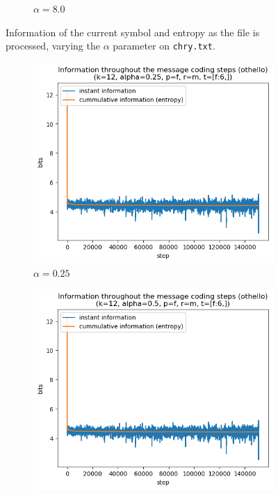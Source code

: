 \documentclass{article}
\begin{document}
\begin{figure}
\begin{subfigure}[b]{0.3\textwidth}
\begin{center}
        \end{center}
        \caption{$\alpha = 8.0$}
        \label{fig:results-alpha-8.0}
    \end{subfigure}
    \caption{Information of the current symbol and entropy as the file is processed, varying the $\alpha$ parameter on \verb|chry.txt|.}
    \label{fig:results-alpha}
\end{figure}

\begin{figure}
    \begin{subfigure}[b]{0.3\textwidth}
        \begin{center}
            \includegraphics[width=1.0\linewidth]{../scripts/images/othello_12_0.25_f_m_[f:6,].png}
        \end{center}
        \caption{$\alpha = 0.25$}
        \label{fig:results-alpha-other-0.25}
    \end{subfigure}
    \hfill
    \begin{subfigure}[b]{0.3\textwidth}
        \begin{center}
            \includegraphics[width=1.0\linewidth]{../scripts/images/othello_12_0.5_f_m_[f:6,].png}

\end{center}
\end{subfigure}
\end{figure}
\end{document}
